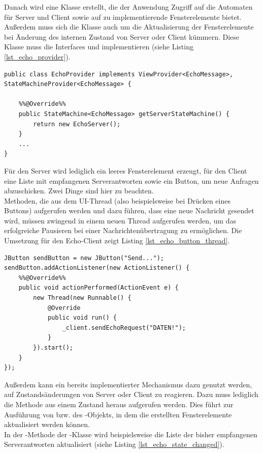 Danach wird eine Klasse  erstellt, die der Anwendung Zugriff auf die Automaten für Server und Client sowie auf zu implementierende Fensterelemente bietet. Außerdem muss sich die Klasse auch um die Aktualisierung der Fensterelemente bei Änderung des internen Zustand von Server oder Client kümmern. Diese Klasse muss die Interfaces  und  implementieren (siehe Listing \ref{lst_echo_provider}).

\begin{lstlisting}[style=java, caption={Implementierung der \sourceobject{EchoProvider}-Klasse}, label=lst_echo_provider]
public class EchoProvider implements ViewProvider<EchoMessage>, StateMachineProvider<EchoMessage> {

	%%@Override%%
	public StateMachine<EchoMessage> getServerStateMachine() {
		return new EchoServer();
	}
	...
}
\end{lstlisting}

Für den Server wird lediglich ein leeres Fensterelement erzeugt, für den Client eine Liste mit empfangenen Serverantworten sowie ein Button, um neue Anfragen abzuschicken. Zwei Dinge sind hier zu beachten.\\
Methoden, die aus dem UI-Thread (also beispielsweise bei Drücken eines Buttons) aufgerufen werden und dazu führen, dass eine neue Nachricht gesendet wird, müssen zwingend in einem neuen Thread aufgerufen werden, um das erfolgreiche Pausieren bei einer Nachrichtenübertragung zu ermöglichen. Die Umsetzung für den Echo-Client zeigt Listing \ref{lst_echo_button_thread}.

\begin{lstlisting}
JButton sendButton = new JButton("Send...");
sendButton.addActionListener(new ActionListener() {
	%%@Override%%
	public void actionPerformed(ActionEvent e) {
		new Thread(new Runnable() {
			@Override
			public void run() {
				_client.sendEchoRequest("DATEN!");
			}
		}).start();
	}
});
\end{lstlisting}

Außerdem kann ein bereits implementierter Mechanismus dazu genutzt werden, auf Zustandsänderungen von Server oder Client zu reagieren. Dazu muss lediglich die Methode  aus einem Zustand heraus aufgerufen werden. Dies führt zur Ausführung von  bzw.  des -Objekts, in dem die erstellten Fensterelemente aktualisiert werden können.\\
In der -Methode der -Klasse wird beispielsweise die Liste der bisher empfangenen Serverantworten aktualisiert (siehe Listing \ref{lst_echo_state_changed}).

